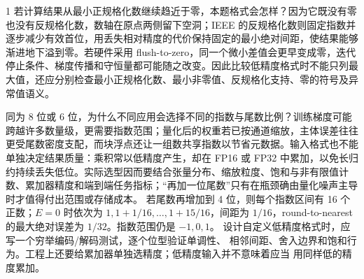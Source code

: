 \begin{solutionexercise}{1}
若计算结果从最小正规格化数继续趋近于零，本题格式会怎样？因为它既没有零也没有反规格化数，数轴在原点两侧留下空洞；IEEE 的反规格化数则固定指数并逐步减少有效首位，用丢失相对精度的代价保持固定的最小绝对间距，使结果能够渐进地下溢到零。若硬件采用 flush-to-zero，同一个微小差值会更早变成零，迭代停止条件、梯度传播和守恒量都可能随之改变。因此比较低精度格式时不能只列最大值，还应分别检查最小正规格化数、最小非零值、反规格化支持、零的符号及异常值语义。

同为 8 位或 6 位，为什么不同应用会选择不同的指数与尾数比例？训练梯度可能跨越许多数量级，更需要指数范围；量化后的权重若已按通道缩放，主体误差往往更受尾数密度支配，而块浮点还让一组数共享指数以节省元数据。输入格式也不能单独决定结果质量：乘积常以低精度产生，却在 FP16 或 FP32 中累加，以免长归约持续丢失低位。实际选型因而要结合张量分布、缩放粒度、饱和与非有限值计数、累加器精度和端到端任务指标；“再加一位尾数”只有在瓶颈确由量化噪声主导时才值得付出范围或存储成本。
\variantheading 若尾数再增加到 4 位，则每个指数区间有 16 个正数；$E=0$ 时依次为
$1,1+1/16,\ldots,1+15/16$，间距为 $1/16$，round-to-nearest 的最大绝对误差为
$1/32$。指数范围仍是 $-1,0,1$。
\practiceheading 设计自定义低精度格式时，应写一个穷举编码/解码测试，逐个位型验证单调性、
相邻间距、舍入边界和饱和行为。工程上还要给累加器单独选精度；低精度输入并不意味着应当
用同样低的精度累加。
\end{solutionexercise}

